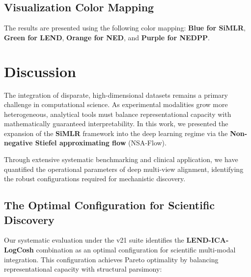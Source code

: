 \documentclass[
  letterpaper,
]{report}
\begin{document}
\section{Visualization Color Mapping}\label{visualization-color-mapping}

The results are presented using the following color mapping:
{\textbf{Blue for SiMLR}}, {\textbf{Green for LEND}}, {\textbf{Orange
for NED}}, and {\textbf{Purple for NEDPP}}.


\chapter{Discussion}\label{discussion}

The integration of disparate, high-dimensional datasets remains a
primary challenge in computational science. As experimental modalities
grow more heterogeneous, analytical tools must balance representational
capacity with mathematically guaranteed interpretability. In this work,
we presented the expansion of the \textbf{SiMLR} framework into the deep
learning regime via the \textbf{Non-negative Stiefel approximating flow}
(NSA-Flow).

Through extensive systematic benchmarking and clinical application, we
have quantified the operational parameters of deep multi-view alignment,
identifying the robust configurations required for mechanistic
discovery.

\section{The Optimal Configuration for Scientific
Discovery}\label{the-optimal-configuration-for-scientific-discovery}

Our systematic evaluation under the v21 suite identifies the
\textbf{LEND-ICA-LogCosh} combination as an optimal configuration for
scientific multi-modal integration. This configuration achieves Pareto
optimality by balancing representational capacity with structural
parsimony:
\end{document}
